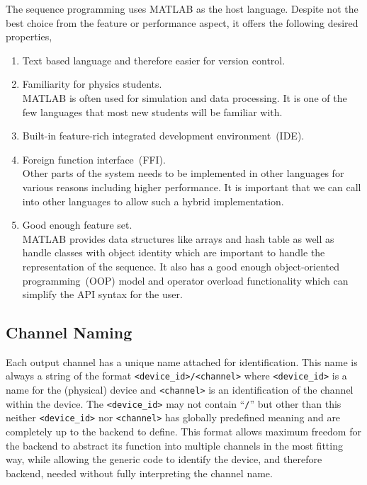The sequence programming uses MATLAB as the host language.
Despite not the best choice from the feature or performance aspect,
it offers the following desired properties,
\begin{enumerate}
\item Text based language and therefore easier for version control.
\item Familiarity for physics students.\\
  MATLAB is often used for simulation and data processing.
  It is one of the few languages that most new students will be familiar with.
\item Built-in feature-rich integrated development environment~(IDE).
\item Foreign function interface~(FFI).\\
  Other parts of the system needs to be implemented in other languages
  for various reasons including higher performance.
  It is important that we can call into other languages to allow such a hybrid implementation.
\item Good enough feature set.\\
  MATLAB provides data structures like arrays and hash table
  as well as handle classes with object identity
  which are important to handle the representation of the sequence.
  It also has a good enough object-oriented programming~(OOP) model
  and operator overload functionality which can simplify the API syntax for the user.
\end{enumerate}

\subsection{Channel Naming}
\label{ch:computer-control:frontend:channel}
Each output channel has a unique name attached for identification.
This name is always a string of the format \verb`<device_id>/<channel>`
where \verb`<device_id>` is a name for the (physical) device
and \verb`<channel>` is an identification of the channel within the device.
The \verb`<device_id>` may not contain ``\verb`/`'' but other than this
neither \verb`<device_id>` nor \verb`<channel>` has globally predefined meaning
and are completely up to the backend to define.
This format allows maximum freedom for the backend to abstract its function
into multiple channels in the most fitting way,
while allowing the generic code to identify the device, and therefore backend,
needed without fully interpreting the channel name.

